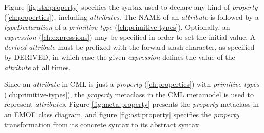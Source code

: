 Figure \ref{fig:stx:property} specifies the syntax used
to declare any kind of \emph{property} (\ref{ch:properties}),
including \emph{attributes}.
The NAME of an \emph{attribute} is followed
by a \emph{typeDeclaration} of a \emph{primitive type}
(\ref{ch:primitive-types}).
Optionally, an \emph{expression} (\ref{ch:expressions}) may be specified
in order to set the initial value.
A \emph{derived attribute} must be prefixed with the forward-slash character,
as specified by DERIVED,
in which case the given \emph{expression} defines the value
of the \emph{attribute} at all times.

Since an \emph{attribute} in CML is just a \emph{property} (\ref{ch:properties})
with \emph{primitive types} (\ref{ch:primitive-types}),
the \emph{property} metaclass in the CML metamodel is used to represent
\emph{attributes}.
Figure \ref{fig:meta:property} presents the \emph{property} metaclass
in an EMOF \cite{mof} class diagram,
and figure \ref{fig:ast:property} specifies
the \emph{property} transformation
from its concrete syntax to its abstract syntax.
